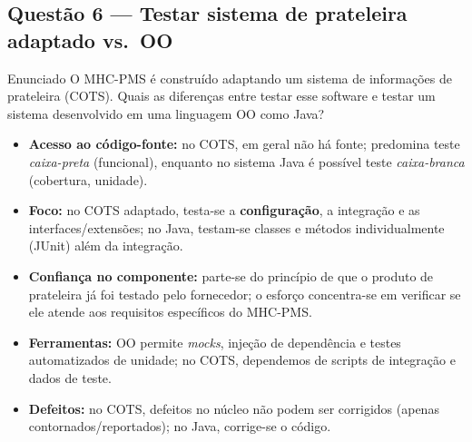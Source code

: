 \documentclass[11pt,a4paper]{article}
\begin{document}
\subsection*{Questão 6 — Testar sistema de prateleira adaptado vs.\ OO}
\begin{questao}{Enunciado}
O MHC-PMS é construído adaptando um sistema de informações de prateleira (COTS).
Quais as diferenças entre testar esse software e testar um sistema desenvolvido
em uma linguagem OO como Java?
\end{questao}
\begin{resposta}
\begin{itemize}[nosep]
  \item \textbf{Acesso ao código-fonte:} no COTS, em geral não há fonte; predomina
        teste \emph{caixa-preta} (funcional), enquanto no sistema Java é possível
        teste \emph{caixa-branca} (cobertura, unidade).
  \item \textbf{Foco:} no COTS adaptado, testa-se a \textbf{configuração}, a
        integração e as interfaces/extensões; no Java, testam-se classes e
        métodos individualmente (JUnit) além da integração.
  \item \textbf{Confiança no componente:} parte-se do princípio de que o produto
        de prateleira já foi testado pelo fornecedor; o esforço concentra-se em
        verificar se ele atende aos requisitos específicos do MHC-PMS.
  \item \textbf{Ferramentas:} OO permite \emph{mocks}, injeção de dependência e
        testes automatizados de unidade; no COTS, dependemos de scripts de
        integração e dados de teste.
  \item \textbf{Defeitos:} no COTS, defeitos no núcleo não podem ser corrigidos
        (apenas contornados/reportados); no Java, corrige-se o código.
\end{itemize}
\end{resposta}

\end{document}
